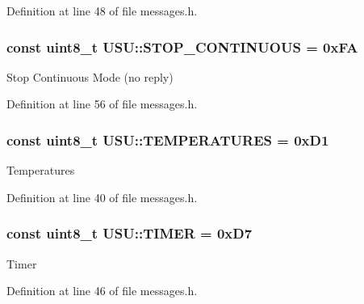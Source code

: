 \-Definition at line 48 of file messages.\-h.

\hypertarget{namespace_u_s_u_ae7447325a101912b787905199c4f2acb}{
\subsubsection[{\-S\-T\-O\-P\-\_\-\-C\-O\-N\-T\-I\-N\-U\-O\-U\-S}]{\setlength{\rightskip}{0pt plus 5cm}const uint8\-\_\-t {\bf \-U\-S\-U\-::\-S\-T\-O\-P\-\_\-\-C\-O\-N\-T\-I\-N\-U\-O\-U\-S} = 0x\-F\-A}}\label{namespace_u_s_u_ae7447325a101912b787905199c4f2acb}
\-Stop \-Continuous \-Mode (no reply) 

\-Definition at line 56 of file messages.\-h.

\hypertarget{namespace_u_s_u_ac5f57d308aea3cdda7c0a2ddade6996b}{
\subsubsection[{\-T\-E\-M\-P\-E\-R\-A\-T\-U\-R\-E\-S}]{\setlength{\rightskip}{0pt plus 5cm}const uint8\-\_\-t {\bf \-U\-S\-U\-::\-T\-E\-M\-P\-E\-R\-A\-T\-U\-R\-E\-S} = 0x\-D1}}\label{namespace_u_s_u_ac5f57d308aea3cdda7c0a2ddade6996b}
\-Temperatures 

\-Definition at line 40 of file messages.\-h.

\hypertarget{namespace_u_s_u_abed08045a54f63e04380a2ac80bcaf79}{
\subsubsection[{\-T\-I\-M\-E\-R}]{\setlength{\rightskip}{0pt plus 5cm}const uint8\-\_\-t {\bf \-U\-S\-U\-::\-T\-I\-M\-E\-R} = 0x\-D7}}\label{namespace_u_s_u_abed08045a54f63e04380a2ac80bcaf79}
\-Timer 

\-Definition at line 46 of file messages.\-h.

